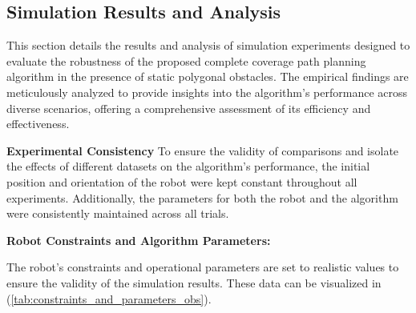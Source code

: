 



\vspace*{6mm}  



\subsection{Simulation Results and Analysis}

This section details the results and analysis of simulation experiments designed to evaluate the robustness of the proposed complete coverage path planning algorithm in the presence of static polygonal obstacles. The empirical findings are meticulously analyzed to provide insights into the algorithm's performance across diverse scenarios, offering a comprehensive assessment of its efficiency and effectiveness.

\vspace*{6mm}  

\textbf{Experimental Consistency}
To ensure the validity of comparisons and isolate the effects of different datasets on the algorithm's performance, the initial position and orientation of the robot were kept constant throughout all experiments. Additionally, the parameters for both the robot and the algorithm were consistently maintained across all trials.

\vspace*{6mm}  

\textbf{Robot Constraints and Algorithm Parameters: } 


The robot's constraints and operational parameters are set to realistic values to ensure the validity of the simulation results. These data can be visualized in (\autoref{tab:constraints_and_parameters_obs}).

